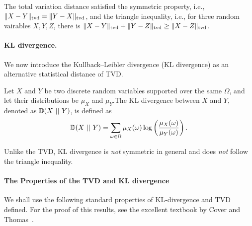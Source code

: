 The total variation distance satisfied the symmetric property, i.e., $\|X - Y\|_{\mathrm{tvd}}=\|Y - X\|_{\mathrm{tvd}}$, and the triangle inequality, i.e., for three random vairables $X,Y,Z$, there is $\|X - Y\|_{\mathrm{tvd}}+\|Y - Z\|_{\mathrm{tvd}}\geq \|X - Z\|_{\mathrm{tvd}}$.

\paragraph{KL divergence.} We now introduce the Kullback–Leibler divergence (KL divergence) as an alternative statistical distance of TVD.

\begin{definition}[KL divergence]
	\label{def:kl-div}
	Let $X$ and $Y$ be two discrete random variables supported over the same $\Omega$, and let their distributions be $\mu_{X}$ and $\mu_{Y}$.The KL divergence between $X$ and $Y$, denoted as $\mathbb{D}(X~||~Y)$, is defined as 
	\begin{align*}
		\mathbb{D}(X~||~Y) = \sum_{\omega\in \Omega} \mu_{X}(\omega)\log\left(\frac{\mu_{X}(\omega)}{\mu_{Y}(\omega)}\right).
	\end{align*}
\end{definition}


Unlike the TVD, KL divergence is \emph{not} symmetric in general and does \emph{not} follow the triangle inequality.


\paragraph{The Properties of the TVD and KL divergence}

We shall use the following standard properties of KL-divergence and TVD defined. For the proof of this results, see the excellent textbook by Cover and Thomas~\cite{CoverT06}. 

